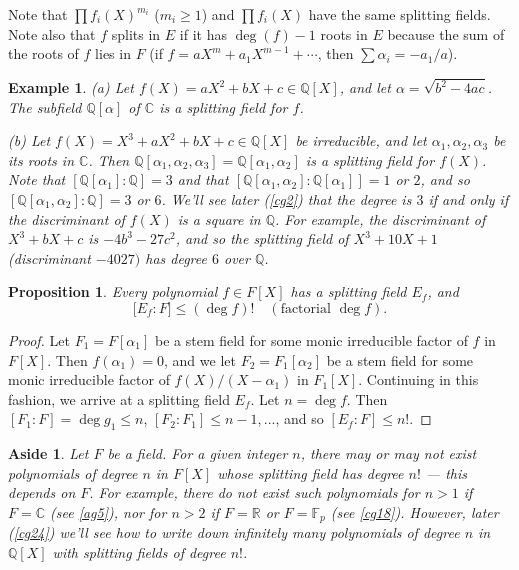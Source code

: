 \documentclass[a4paper,11pt,final,openany]{memoir}
\newtheorem{proposition}[X]{Proposition}
\newtheorem{example}[X]{Example}
\newtheorem{aside}[X]{Aside}
\theoremstyle{nonumberplain}
\newtheorem{proof}{Proof.}
\begin{document}
Note that $\prod f_{i}(X)^{m_{i}}$ ($m_{i}\geq1$) and $\prod f_{i}(X)$ have
the same splitting fields. Note also that $f$ splits in $E$ if it has
$\deg(f)-1$ roots in $E$ because the sum of the roots of $f$ lies in $F$ (if
$f=aX^{m}+a_{1}X^{m-1}+\cdots$, then $\sum\alpha_{i}=-a_{1}/a$).

\begin{example}
\label{sf3}(a) Let $f(X)=aX^{2}+bX+c\in\mathbb{Q}{}[X]$, and let $\alpha
=\sqrt{b^{2}-4ac}$. The subfield $\mathbb{Q}[\alpha]$ of $\mathbb{C}$ is a
splitting field for $f$.

(b) Let $f(X)=X^{3}+aX^{2}+bX+c\in\mathbb{Q}[X]$ be irreducible, and let
$\alpha_{1},\alpha_{2},\alpha_{3}$ be its roots in $\mathbb{C}$. Then
$\mathbb{Q}[\alpha_{1},\alpha_{2},\alpha_{3}]=\mathbb{Q}[\alpha_{1},\alpha
_{2}]$ is a splitting field for $f(X)$. Note that $[\mathbb{Q}[\alpha
_{1}]\colon\mathbb{Q}]=3$ and that $[\mathbb{Q}[\alpha_{1},\alpha_{2}%
]\colon\mathbb{Q}[\alpha_{1}]]=1$ or $2$, and so $[\mathbb{Q}[\alpha
_{1},\alpha_{2}]\colon\mathbb{Q}]=3$ or $6$. We'll see later (\ref{cg2}) that
the degree is $3$ if and only if the discriminant of $f(X)$ is a square in
$\mathbb{Q}{}$. For example, the discriminant of $X^{3}+bX+c$ is
$-4b^{3}-27c^{2}$, and so the splitting field of $X^{3}+10X+1$ (discriminant
$-4027)$ has degree $6$ over $\mathbb{Q}$.
\end{example}

\begin{proposition}
\label{sf4}Every polynomial $f\in F[X]$ has a splitting field $E_{f}$, and
\[
\lbrack E_{f}\colon F]\leq(\deg f)!\quad(\text{factorial }\deg f).
\]

\end{proposition}

\begin{proof}
Let $F_{1}=F[\alpha_{1}]$ be a stem field for some monic irreducible factor of
$f$ in $F[X]$. Then $f(\alpha_{1})=0$, and we let $F_{2}=F_{1}[\alpha_{2}]$ be
a stem field for some monic irreducible factor of $f(X)/(X-\alpha_{1})$ in
$F_{1}[X]$. Continuing in this fashion, we arrive at a splitting field $E_{f}%
$. Let $n=\deg f$. Then $[F_{1}\colon F]=\deg g_{1}\leq n$, $[F_{2}\colon
F_{1}]\leq n-1,...$, and so $[E_{f}\colon F]\leq n!$.
\end{proof}

\begin{aside}
\label{sf5}Let $F$ be a field. For a given integer $n$, there may or may not
exist polynomials of degree $n$ in $F[X]$ whose splitting field has degree
$n!$ --- this depends on $F$. For example, there do not exist such polynomials
for $n>1$ if $F=\mathbb{C}$ (see \ref{ag5}), nor for $n>2$ if $F=\mathbb{R}$
or $F=\mathbb{F}_{p}$ (see \ref{cg18}). However, later (\ref{cg24}) we'll see
how to write down infinitely many polynomials of degree $n$ in $\mathbb{Q}[X]$
with splitting fields of degree $n!$.
\end{aside}
\end{document}
